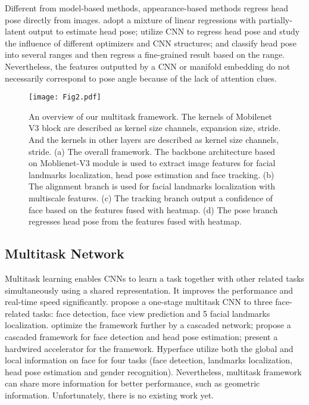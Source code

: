\documentclass[3p,twocolumn, round, sort & compress]{elsarticle}
\begin{document}
Different from model-based methods, appearance-based methods regress head pose directly from images. \citep{Robust_pose} adopt a mixture of linear regressions with partially-latent output to estimate head pose; \citep{CNN-Pose} utilize CNN to regress head pose and study the influence of different optimizers and CNN structures; \citep{Ruzi} and \citep{FSA-Net} classify head pose into several ranges and then regress a fine-grained result based on the range. Nevertheless, the features outputted by a CNN or manifold embedding do not necessarily correspond to pose angle because of the lack of attention clues.

\begin{figure*}[t!]
	\centering
	\texttt{[image: Fig2.pdf]}
	\caption{An overview of our multitask framework. The kernels of Mobilenet V3 block are described as kernel size  channels, expansion size, stride. And the kernels in other layers are described as kernel size  channels, stride. (a) The overall framework. The backbone architecture based on Moblienet-V3 module is used to extract image features for facial landmarks localization, head pose estimation and face tracking. (b) The alignment branch is used for facial landmarks localization with multiscale features. (c) The tracking branch output a confidence of face based on the features fused with heatmap. (d) The pose branch regresses head pose from the features fused with heatmap.}
	\label{fig2}
\end{figure*}

\subsection{Multitask Network}
Multitask learning enables CNNs to learn a task together with other related tasks simultaneously using a shared representation. It improves the performance and real-time speed significantly. \citep{zhang-multi} propose a one-stage multitask CNN to three face-related tasks: face detection, face view prediction and 5 facial landmarks localization. \citep{MTCNN} optimize the framework further by a cascaded network; \citep{Multitask-pose} propose a cascaded framework for face detection and head pose estimation; \citep{Hard-MTCNN} present a hardwired accelerator for the framework. Hyperface \citep{Hyperface} utilize both the global and local information on face for four tasks (face detection, landmarks localization, head pose estimation and gender recognition). Nevertheless, multitask framework can share more information for better performance, such as geometric information. Unfortunately, there is no existing work yet.
\end{document}
